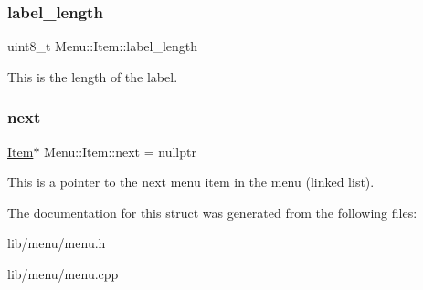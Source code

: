 \subsubsection{\texorpdfstring{label\+\_\+length}{label\_length}}
{\footnotesize\ttfamily uint8\+\_\+t Menu\+::\+Item\+::label\+\_\+length}

This is the length of the label. \hypertarget{struct_menu_1_1_item_aadcc1e4e824296c6b72ac7d053f06869}{}\label{struct_menu_1_1_item_aadcc1e4e824296c6b72ac7d053f06869} 
\subsubsection{\texorpdfstring{next}{next}}
{\footnotesize\ttfamily \hyperlink{struct_menu_1_1_item}{Item}$\ast$ Menu\+::\+Item\+::next = nullptr}

This is a pointer to the next menu item in the menu (linked list). 

The documentation for this struct was generated from the following files\+:\begin{DoxyCompactItemize}
\item 
lib/menu/menu.\+h\item 
lib/menu/menu.\+cpp\end{DoxyCompactItemize}
